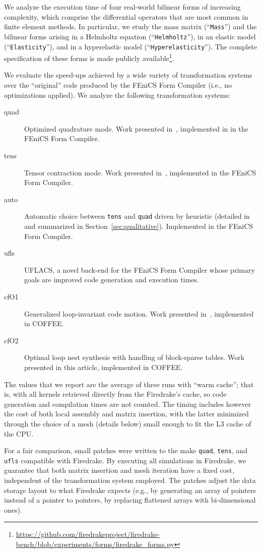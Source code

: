 We analyze the execution time of four real-world bilinear forms of increasing complexity, which comprise the differential operators that are most common in finite element methods. In particular, we study the mass matrix (``\texttt{Mass}'') and the bilinear forms arising in a Helmholtz equation (``\texttt{Helmholtz}''), in an elastic model (``\texttt{Elasticity}''), and in a hyperelastic model (``\texttt{Hyperelasticity}''). The complete specification of these forms is made publicly available\footnote{\url{https://github.com/firedrakeproject/firedrake-bench/blob/experiments/forms/firedrake_forms.py}}. 

We evaluate the speed-ups achieved by a wide variety of transformation systems over the ``original'' code produced by the FEniCS Form Compiler (i.e., no optimizations applied). We analyze the following transformation systems:
\begin{description}
\item[quad] Optimized quadrature mode. Work presented in~\cite{quadrature-olegaard}, implemented in  in the FEniCS Form Compiler. 
\item[tens] Tensor contraction mode. Work presented in~\cite{FFC-TC}, implemented in the FEniCS Form Compiler.
\item[auto] Automatic choice between \texttt{tens} and \texttt{quad} driven by heuristic (detailed in~\cite{Fenics} and summarized in Section~\ref{sec:qualitative}). Implemented in the FEniCS Form Compiler.
\item[ufls] UFLACS, a novel back-end for the FEniCS Form Compiler whose primary goals are improved code generation and execution times.
\item[cfO1] Generalized loop-invariant code motion. Work presented in~\cite{Luporini}, implemented in COFFEE.
\item[cfO2] Optimal loop nest synthesis with handling of block-sparse tables. Work presented in this article, implemented in COFFEE.
\end{description}

The values that we report are the average of three runs with ``warm cache''; that is, with all kernels retrieved directly from the Firedrake's cache, so code generation and compilation times are not counted. The timing includes however the cost of both local assembly and matrix insertion, with the latter minimized through the choice of a mesh (details below) small enough to fit the L3 cache of the CPU. 

For a fair comparison, small patches were written to the make \texttt{quad}, \texttt{tens}, and \texttt{ufls} compatible with Firedrake. By executing all simulations in Firedrake, we guarantee that both matrix insertion and mesh iteration have a fixed cost, independent of the transformation system employed. The patches adjust the data storage layout to what Firedrake expects (e.g., by generating an array of pointers instead of a pointer to pointers, by replacing flattened arrays with bi-dimensional ones). 

